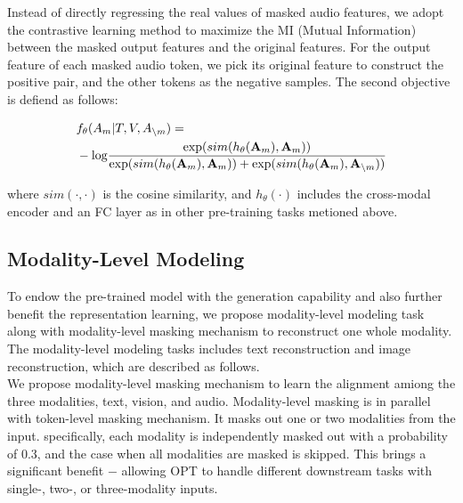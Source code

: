 \documentclass[10pt,twocolumn,letterpaper]{article}
\begin{document}
Instead of directly regressing the real values of masked audio features, we adopt the contrastive learning method to maximize the MI (Mutual Information) between the masked output features and the original features. For the output feature of each masked audio token, we pick its original feature to construct the positive pair, and the other tokens as the negative samples. The second objective is defiend as follows: 
\begin{small}
\begin{align}
&f_{\theta}(A_m|T, V, A_{\backslash m}) = \notag \\
&-\mathrm{log} \frac{\mathrm{exp}(sim(h_\theta(\boldsymbol{\mathrm{A}}_m), \boldsymbol{\mathrm{A}}_m))}{\mathrm{exp}(sim(h_\theta(\boldsymbol{\mathrm{A}}_m), \boldsymbol{\mathrm{A}}_m)) + \mathrm{exp}(sim(h_\theta(\boldsymbol{\mathrm{A}}_m), \boldsymbol{\mathrm{A}}_{\backslash m}))}
\end{align}
\end{small}
where $sim(\cdot,\cdot)$ is the cosine similarity, and $h_\theta(\cdot)$ includes the cross-modal encoder and an FC layer as in other pre-training tasks metioned above.

\subsection{Modality-Level Modeling}
To endow the pre-trained model with the generation capability and also further benefit the representation learning, we propose modality-level modeling task along with modality-level masking mechanism to reconstruct one whole modality. The modality-level modeling tasks includes text reconstruction and image reconstruction, which are described as follows.  \\

 We propose modality-level masking mechanism to learn the alignment amiong the three modalities, \ie text, vision, and audio. Modality-level masking is in parallel with token-level masking mechanism. It masks out one or two modalities from the input. specifically, each modality is independently masked out with a probability of 0.3, and the case when all modalities are masked is skipped. This brings a significant benefit  $-$ allowing OPT to handle different downstream tasks with single-, two-, or three-modality inputs. \\
\end{document}
